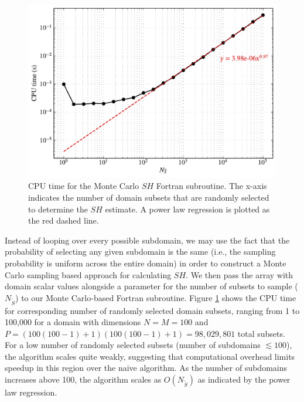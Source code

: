 \begin{figure}[!t]
	\centering
	\includegraphics[width=\textwidth]{figures/chapter2/mcNSH-performance.pdf}
	\caption{CPU time for the Monte Carlo $SH$ Fortran subroutine. The x-axis indicates the number of domain subsets that are randomly selected to determine the $SH$ estimate. A power law regression is plotted as the red dashed line.}
	\label{fig:mcsh-performance}
\end{figure}

Instead of looping over every possible subdomain, we may use the fact that the probability of selecting any given subdomain is the same (i.e., the sampling probability is uniform across the entire domain) in order to construct a Monte Carlo sampling based approach for calculating $SH$. We then pass the array with domain scalar values alongside a parameter for the number of subsets to sample ($N_{\tilde{S}}$) to our Monte Carlo-based Fortran subroutine. Figure \ref{fig:mcsh-performance} shows the CPU time for corresponding number of randomly selected domain subsets, ranging from 1 to 100,000 for a domain with dimensions $N=M=100$ and $P=(100(100-1)+1)(100(100-1)+1) = 98,029,801$ total subsets. For a low number of randomly selected subsets (number of subdomains $\lesssim 100$), the algorithm scales quite weakly, suggesting that computational overhead limits speedup in this region over the naive algorithm. As the number of subdomains increases above 100, the algorithm scales as $O(N_{\tilde{S}})$ as indicated by the power law regression.

